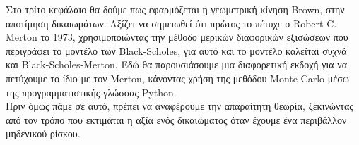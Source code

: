 \documentclass[12pt,a4paper,twoside,openany]{book}
\begin{document}
	Στο τρίτο κεφάλαιο θα δούμε πως εφαρμόζεται η γεωμετρική κίνηση Brown, στην αποτίμηση δικαιωμάτων. Αξίζει να σημειωθεί ότι πρώτος το πέτυχε ο Robert C. Merton το 1973, χρησιμοποιώντας την μέθοδο μερικών διαφορικών εξισώσεων που περιγράφει το μοντέλο των Black-Scholes, για αυτό και το μοντέλο καλείται συχνά και Black-Scholes-Merton. Εδώ θα παρουσιάσουμε μια διαφορετική εκδοχή για να πετύχουμε το ίδιο με τον Merton, κάνοντας χρήση της μεθόδου Monte-Carlo μέσω της προγραμματιστικής γλώσσας Python.
\vspace{2.5mm}\\
	Πριν όμως πάμε σε αυτό, πρέπει να αναφέρουμε την απαραίτητη θεωρία, ξεκινώντας από τον τρόπο που εκτιμάται η αξία ενός δικαιώματος όταν έχουμε ένα περιβάλλον μηδενικού ρίσκου.
	
\end{document}
